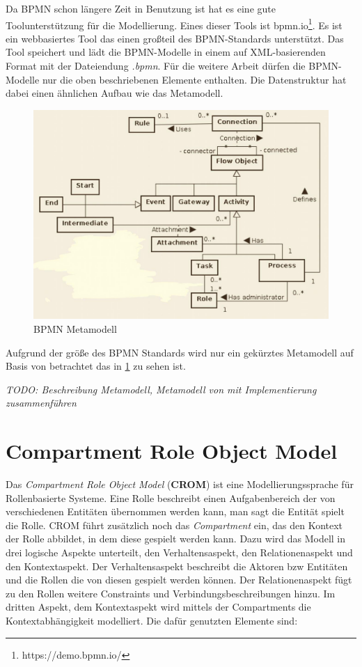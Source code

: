 Da BPMN schon längere Zeit in Benutzung ist hat es eine gute Toolunterstützung für die Modellierung.
Eines dieser Tools ist bpmn.io\footnote{https://demo.bpmn.io/}.
Es ist ein webbasiertes Tool das einen großteil des BPMN-Standards unterstützt.
Das Tool speichert und lädt die BPMN-Modelle in einem auf XML-basierenden Format mit der Dateiendung \emph{.bpmn}.
Für die weitere Arbeit dürfen die BPMN-Modelle nur die oben beschriebenen Elemente enthalten.
Die Datenstruktur hat dabei einen ähnlichen Aufbau wie das Metamodell.

\begin{figure}
    \centering
    \includegraphics[width=\textwidth,keepaspectratio]{../images/bpmnMetamodell.jpg}%
    \caption{BPMN Metamodell}%
    \label{fig:bpmnMetamodell}
\end{figure}

Aufgrund der größe des BPMN Standards wird nur ein gekürztes Metamodell auf Basis von \cite{Loja2010} betrachtet das in \cref{fig:bpmnMetamodell} zu sehen ist.

\textit{TODO: Beschreibung Metamodell, Metamodell von \cite{Loja2010} mit Implementierung zusammenführen}

\section{Compartment Role Object Model}

Das \emph{Compartment Role Object Model} (\textbf{CROM}) ist eine Modellierungssprache für Rollenbasierte Systeme.
Eine Rolle beschreibt einen Aufgabenbereich der von verschiedenen Entitäten übernommen werden kann, man sagt die Entität spielt die Rolle.
CROM führt zusätzlich noch das \emph{Compartment} ein, das den Kontext der Rolle abbildet, in dem diese gespielt werden kann.
Dazu wird das Modell in drei logische Aspekte unterteilt, den Verhaltensaspekt, den Relationenaspekt und den Kontextaspekt.
Der Verhaltensaspekt beschreibt die Aktoren bzw Entitäten und die Rollen die von diesen gespielt werden können.
Der Relationenaspekt fügt zu den Rollen weitere Constraints und Verbindungsbeschreibungen hinzu.
Im dritten Aspekt, dem Kontextaspekt wird mittels der Compartments die Kontextabhängigkeit modelliert.
Die dafür genutzten Elemente sind:

